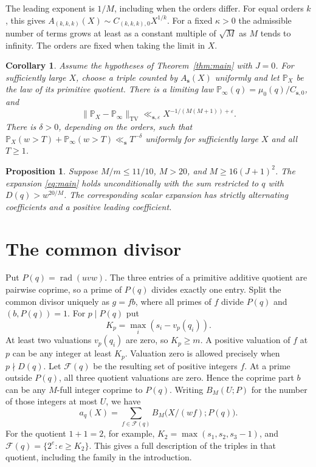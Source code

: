 \documentclass[11pt,reqno]{amsart}
\newtheorem{proposition}[theorem]{Proposition}
\newtheorem{corollary}[theorem]{Corollary}
\DeclareMathOperator{\rad}{rad}
\newcommand{\eps}{\varepsilon}
\newcommand{\sord}{\boldsymbol{s}}
\begin{document}
The leading exponent is \(1/M\), including when the orders differ. For
equal orders \(k\), this gives \(A_{(k,k,k)}(X)\sim C_{(k,k,k),0}X^{1/k}\).
For a fixed \(\kappa>0\) the admissible number of terms grows at least
as a constant multiple of \(\sqrt M\) as \(M\) tends to infinity. The
orders are fixed when taking the limit in \(X\).

\begin{corollary}\label{cor:law}
Assume the hypotheses of Theorem~\ref{thm:main} with \(J=0\). For sufficiently
large \(X\), choose a triple counted by \(A_{\sord}(X)\) uniformly and let
\(\mathbb P_X\) be the law of its primitive quotient. There is a limiting law
\(\mathbb P_\infty(q)=\mu_0(q)/C_{\sord,0}\), and
\[
  \|\mathbb P_X-\mathbb P_\infty\|_{\mathrm{TV}}
  \ll_{\sord,\eps} X^{-1/(M(M+1))+\eps}.
\]
There is \(\delta>0\), depending on the orders, such that
\(\mathbb P_X(w>T)+\mathbb P_\infty(w>T)\ll_{\sord}T^{-\delta}\)
uniformly for sufficiently large \(X\) and all \(T\ge1\).
\end{corollary}

\begin{proposition}\label{prop:sector}
Suppose \(M/m\le11/10\), \(M>20\), and \(M\ge16(J+1)^2\). The expansion
\eqref{eq:main} holds unconditionally with the sum restricted to
\(q\) with \(D(q)>w^{20/M}\). The corresponding scalar expansion has
strictly alternating coefficients and a positive leading coefficient.
\end{proposition}

\section{The common divisor}\label{sec:divisor}

Put \(P(q)=\rad(uvw)\). The three entries of a primitive additive quotient
are pairwise coprime, so a prime of \(P(q)\) divides exactly one entry.
Split the common divisor uniquely as \(g=fb\), where all primes of \(f\)
divide \(P(q)\) and \((b,P(q))=1\). For \(p\mid P(q)\) put
\[
  K_p=\max_i(s_i-v_p(q_i)).
\]
At least two valuations \(v_p(q_i)\) are zero, so \(K_p\ge m\). A positive
valuation of \(f\) at \(p\) can be any integer at least \(K_p\). Valuation
zero is allowed precisely when \(p\nmid D(q)\). Let \(\mathcal F(q)\)
be the resulting set of positive integers \(f\). At a prime outside
\(P(q)\), all three quotient valuations are zero. Hence the coprime part
\(b\) can be any \(M\)-full integer coprime to \(P(q)\). Writing
\(B_M(U;P)\) for the number of those integers at most \(U\), we have
\begin{equation}\label{eq:fibres}
  a_q(X)=\sum_{f\in\mathcal F(q)} B_M\bigl(X/(wf);P(q)\bigr).
\end{equation}
For the quotient \(1+1=2\), for example, \(K_2=\max(s_1,s_2,s_3-1)\),
and \(\mathcal F(q)=\{2^e:e\ge K_2\}\). This gives a full description of
the triples in that quotient, including the family in the introduction.
\end{document}
